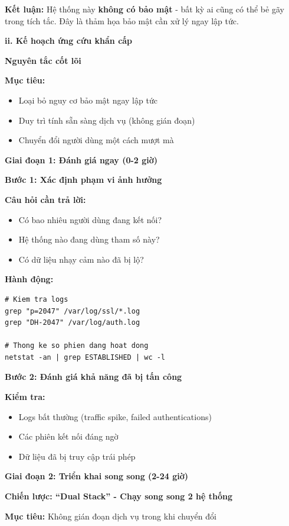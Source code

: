 \textbf{Kết luận:} Hệ thống này \textbf{không có bảo mật} - bất kỳ ai cũng có thể bẻ gãy trong tích tắc. Đây là thảm họa bảo mật cần xử lý ngay lập tức.

\textbf{ii. Kế hoạch ứng cứu khẩn cấp}

\textbf{Nguyên tắc cốt lõi}

\textbf{Mục tiêu:}
\begin{itemize}
    \item Loại bỏ nguy cơ bảo mật ngay lập tức
    \item Duy trì tính sẵn sàng dịch vụ (không gián đoạn)
    \item Chuyển đổi người dùng một cách mượt mà
\end{itemize}

\textbf{Giai đoạn 1: Đánh giá ngay (0-2 giờ)}

\textbf{Bước 1: Xác định phạm vi ảnh hưởng}

\textbf{Câu hỏi cần trả lời:}
\begin{itemize}
    \item Có bao nhiêu người dùng đang kết nối?
    \item Hệ thống nào đang dùng tham số này?
    \item Có dữ liệu nhạy cảm nào đã bị lộ?
\end{itemize}

\textbf{Hành động:}

\begin{verbatim}
# Kiem tra logs
grep "p=2047" /var/log/ssl/*.log
grep "DH-2047" /var/log/auth.log

# Thong ke so phien dang hoat dong
netstat -an | grep ESTABLISHED | wc -l
\end{verbatim}

\textbf{Bước 2: Đánh giá khả năng đã bị tấn công}

\textbf{Kiểm tra:}
\begin{itemize}
    \item Logs bất thường (traffic spike, failed authentications)
    \item Các phiên kết nối đáng ngờ
    \item Dữ liệu đã bị truy cập trái phép
\end{itemize}

\textbf{Giai đoạn 2: Triển khai song song (2-24 giờ)}

\textbf{Chiến lược: ``Dual Stack'' - Chạy song song 2 hệ thống}

\textbf{Mục tiêu:} Không gián đoạn dịch vụ trong khi chuyển đổi

